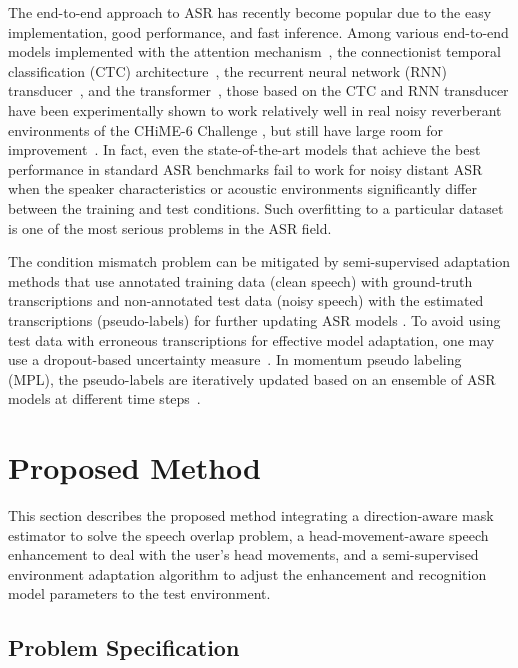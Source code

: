 \documentclass[a4paper]{article}
\begin{document}
The end-to-end approach to ASR
 has recently become popular
 due to the easy implementation, good performance, and fast inference.
Among various end-to-end models implemented
 with the attention mechanism~\cite{attention},
 the connectionist temporal classification (CTC) architecture~\cite{graves_connectionist_2006},
 the recurrent neural network (RNN) transducer~\cite{DBLP:journals/corr/abs-1211-3711},
 and the transformer~\cite{gulati20_interspeech},
 those based on the CTC and RNN transducer 
 have been experimentally shown to work relatively well
 in real noisy reverberant environments of the CHiME-6 Challenge \cite{watanabe20b_chime},
 but still have large room for improvement~\cite{andrusenko_towards_2020}.
In fact,
 even the state-of-the-art models 
 that achieve the best performance in standard ASR benchmarks fail to work
 for noisy distant ASR
 when the speaker characteristics or acoustic environments significantly differ
 between the training and test conditions.
Such overfitting to a particular dataset
 is one of the most serious problems in the ASR field.

The condition mismatch problem
 can be mitigated by semi-supervised adaptation methods
 that use annotated training data (clean speech) with ground-truth transcriptions
 and non-annotated test data (noisy speech) with the estimated transcriptions (pseudo-labels) 
 for further updating ASR models
 \cite{weninger20_interspeech,DBLP:journals/corr/abs-2010-15653,
 xu20b_interspeech,park20d_interspeech}.
To avoid using test data with erroneous transcriptions 
 for effective model adaptation,
 one may use a dropout-based uncertainty measure~\cite{DBLP:conf/icassp/KhuranaMHR21}.
In momentum pseudo labeling (MPL),
 the pseudo-labels are iteratively updated based on an ensemble of ASR models 
 at different time steps~\cite{higuchi21_interspeech}.

\section{Proposed Method}
\label{sec:proposed_method}
This section
describes the proposed method
integrating
a direction-aware mask estimator to solve the speech overlap problem,
a head-movement-aware speech enhancement to deal with the user's head movements,
and a semi-supervised environment adaptation algorithm
to adjust the enhancement and recognition model parameters to the test environment.

\subsection{Problem Specification}
\end{document}

